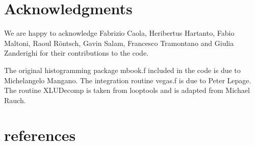 \documentclass[12pt]{article}
\begin{document}
\section*{Acknowledgments}
We are happy to acknowledge Fabrizio Caola, Heribertus Hartanto, Fabio
Maltoni, Raoul R{\"o}ntsch, Gavin Salam, Francesco Tramontano and
Giulia Zanderighi for their contributions to the code.

The original histogramming package mbook.f included in the code is due
to Michelangelo Mangano.  The integration routine vegas.f is due to
Peter Lepage.  The routine XLUDecomp is taken from looptools and is
adapted from Michael Rauch.



\appendix
\section{\MCFM references}
\label{MCFMrefs}
\end{document}

